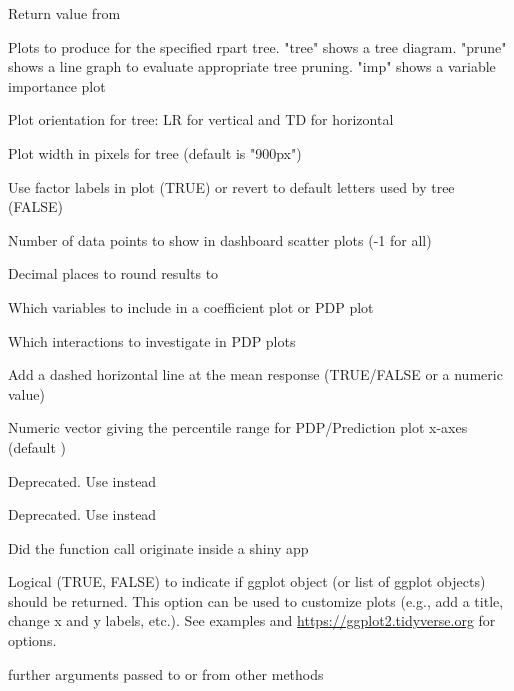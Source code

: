\documentclass[a4paper]{book}
\begin{document}
\begin{Arguments}
\begin{ldescription}
\item[\code{x}] Return value from 

\item[\code{plots}] Plots to produce for the specified rpart tree. "tree" shows a tree diagram. "prune" shows a line graph to evaluate appropriate tree pruning. "imp" shows a variable importance plot

\item[\code{orient}] Plot orientation for tree: LR for vertical and TD for horizontal

\item[\code{width}] Plot width in pixels for tree (default is "900px")

\item[\code{labs}] Use factor labels in plot (TRUE) or revert to default letters used by tree (FALSE)

\item[\code{nrobs}] Number of data points to show in dashboard scatter plots (-1 for all)

\item[\code{dec}] Decimal places to round results to

\item[\code{incl}] Which variables to include in a coefficient plot or PDP plot

\item[\code{incl\_int}] Which interactions to investigate in PDP plots

\item[\code{hline}] Add a dashed horizontal line at the mean response (TRUE/FALSE or a numeric value)

\item[\code{pdp\_range}] Numeric vector  giving the percentile range for PDP/Prediction plot x-axes (default )

\item[\code{minq}] Deprecated. Use  instead

\item[\code{maxq}] Deprecated. Use  instead

\item[\code{shiny}] Did the function call originate inside a shiny app

\item[\code{custom}] Logical (TRUE, FALSE) to indicate if ggplot object (or list of ggplot objects) should be returned. This option can be used to customize plots (e.g., add a title, change x and y labels, etc.). See examples and \url{https://ggplot2.tidyverse.org} for options.

\item[\code{...}] further arguments passed to or from other methods
\end{ldescription}
\end{Arguments}
\end{document}
